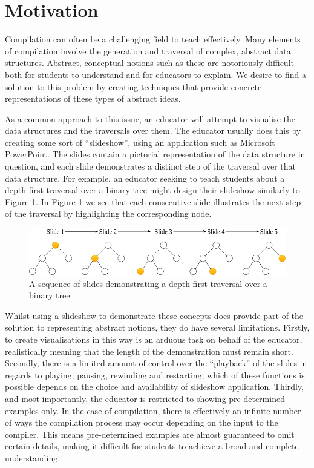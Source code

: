 \documentclass{l4proj}
\begin{document}
\section{Motivation}
Compilation can often be a challenging field to teach effectively. Many elements of compilation involve the generation and traversal of complex, abstract data structures. Abstract, conceptual notions such as these are notoriously difficult both for students to understand and for educators to explain. We desire to find a solution to this problem by creating techniques that provide concrete representations of these types of abstract ideas.

As a common approach to this issue, an educator will attempt to visualise the data structures and the traversals over them. The educator usually does this by creating some sort of ``slideshow'', using an application such as Microsoft PowerPoint. The slides contain a pictorial representation of the data structure in question, and each slide demonstrates a distinct step of the traversal over that data structure. For example, an educator seeking to teach students about a depth-first traversal over a binary tree might design their slideshow similarly to Figure \ref{fig:slideshow}. In Figure \ref{fig:slideshow} we see that each consecutive slide illustrates the next step of the traversal by highlighting the corresponding node.

\begin{figure}
\centering
\includegraphics[scale=0.5]{images/slideshow.png}
\caption{A sequence of slides demonstrating a depth-first traversal over a binary tree}
\label{fig:slideshow}	
\end{figure}

Whilst using a slideshow to demonstrate these concepts does provide part of the solution to representing abstract notions, they do have several limitations. Firstly, to create visualisations in this way is an arduous task on behalf of the educator, realistically meaning that the length of the demonstration must remain short. Secondly, there is a limited amount of control over the “playback” of the slides in regards to playing, pausing, rewinding and restarting; which of these functions is possible depends on the choice and availability of slideshow application. Thirdly, and most importantly, the educator is restricted to showing pre-determined examples only. In the case of compilation, there is effectively an infinite number of ways the compilation process may occur depending on the input to the compiler. This means pre-determined examples are almost guaranteed to omit certain details, making it difficult for students to achieve a broad and complete understanding.
\end{document}
